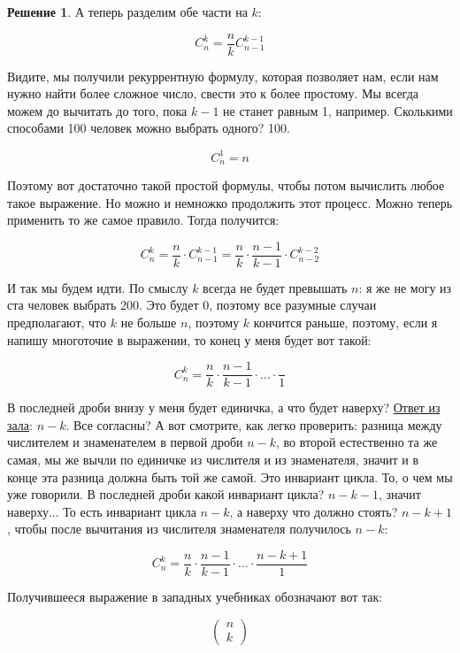 \documentclass[russian]{lecture-notes}
\theoremstyle{definition}
\newtheorem*{solution}{Решение}
\begin{document}
\begin{enumerate}
\begin{solution}
			 А теперь разделим обе части на $k$:
			 
			 \[
			 	C_n^k = \frac{n}{k}C_{n-1}^{k-1}
			 \]
			 
			 Видите, мы получили рекуррентную формулу, которая позволяет нам, если нам нужно найти более сложное число, свести это к более простому. Мы всегда можем до вычитать до того, пока $k-1$ не станет равным 1, например. Сколькими способами 100 человек можно выбрать одного? 100. 
			 
			 \[
			 C_n^1 = n
			 \] 
			 
			 Поэтому вот достаточно такой простой формулы, чтобы потом вычислить любое такое выражение. Но можно и немножко продолжить этот процесс. Можно теперь применить то же самое правило. Тогда получится:
			 
			 \[
			 	C_n^k = \frac{n}{k} \cdot C_{n-1}^{k-1} = \frac{n}{k} \cdot \frac{n-1}{k-1} \cdot C_{n-2}^{k-2}
			 \]
			 
			 И так мы будем идти. По смыслу $k$ всегда не будет превышать $n$: я же не могу из ста человек выбрать 200. Это будет 0, поэтому все разумные случаи предполагают, что $k$ не больше $n$, поэтому $k$ кончится раньше, поэтому, если я напишу многоточие в выражении, то конец у меня будет вот такой:
			 
			 \[
			 	C_n^k = \frac{n}{k} \cdot \frac{n-1}{k-1} \cdot \ldots \cdot \frac{}{1}
			 \]
			 
			 В последней дроби внизу у меня будет единичка, а что будет наверху? \underline{Ответ из зала}: $n-k$. Все согласны? А вот смотрите, как легко проверить: разница между числителем и знаменателем в первой дроби $n - k$, во второй естественно та же самая, мы же вычли по единичке из числителя и из знаменателя, значит и в конце эта разница должна быть той же самой.  Это инвариант цикла. То, о чем мы уже говорили. В последней дроби какой инвариант цикла? $n - k - 1$, значит наверху... То есть инвариант цикла $n - k$, а наверху что должно стоять? $n - k + 1$, чтобы после вычитания из числителя знаменателя получилось $n - k$:
			 
			 \[
			 	C_n^k = \frac{n}{k} \cdot \frac{n-1}{k-1} \cdot \ldots \cdot \frac{n - k + 1}{1}
			 \]
			 
			 Получившееся выражение в западных учебниках обозначают вот так:
			 
			 \[
			 	\left(
			 	\begin{array}{c}
				 	n \\
				 	k
			 	\end{array}
			 	\right)
			 \]
			 

\end{solution}
\end{enumerate}
\end{document}
